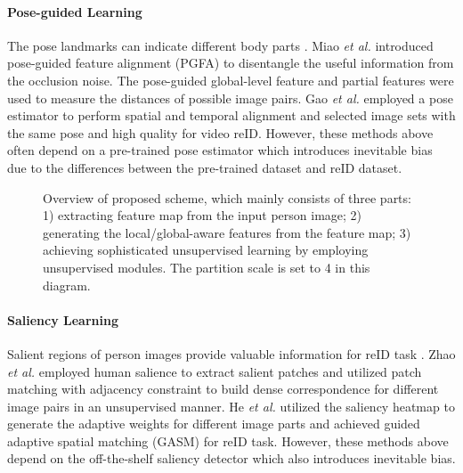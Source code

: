 \documentclass{cta-author}
\begin{document}
	\paragraph{Pose-guided Learning}
	The pose landmarks can indicate different body parts \cite{RN145} \cite{RN472} \cite{RN108}. Miao \textit{et al.} \cite{RN291} introduced pose-guided feature alignment (PGFA) to disentangle the useful information from the occlusion noise. The pose-guided global-level feature and partial features were used to measure the distances of possible image pairs. Gao \textit{et al.} \cite{RN533} employed a pose estimator to perform spatial and temporal alignment and selected image sets with the same pose and high quality for video reID. However, these methods above often depend on a pre-trained pose estimator which introduces inevitable bias due to the differences between the pre-trained dataset and reID dataset.
	
	\begin{figure*}[!h]
		\caption{Overview of proposed scheme, which mainly consists of three parts: 1) extracting feature map from the input person image; 2) generating the local/global-aware features from the feature map; 3) achieving sophisticated unsupervised learning by employing unsupervised modules. The partition scale  is set to 4 in this diagram. \label{scheme}} 
	\end{figure*}
	
	\paragraph{Saliency Learning}
	Salient regions of person images provide valuable information for reID task \cite{RN484} \cite{RN216}. Zhao \textit{et al.} \cite{RN100} employed human salience to extract salient patches and utilized patch matching with adjacency constraint to build dense correspondence for different image pairs in an unsupervised manner. He \textit{et al.} \cite{RN478} utilized the saliency heatmap to generate the adaptive weights for different image parts and achieved guided adaptive spatial matching (GASM) for reID task. However, these methods above depend on the off-the-shelf saliency detector which also introduces inevitable bias.
	
\end{document}
